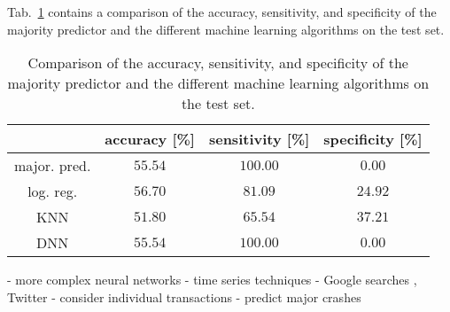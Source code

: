 Tab.~\ref{tab:comparison} contains a comparison of the accuracy, sensitivity, and specificity of the majority predictor and the different machine learning algorithms on the test set.

\begin{table}[h!]
\centering
\begin{tabular}{c||c|c|c}
   & accuracy [\%] & sensitivity [\%] & specificity [\%] \\
   \hline
   \hline
major. pred. & $55.54$ & $100.00$ & $0.00$\\
\hline
log. reg. & $56.70$ & $81.09$ & $24.92$ \\ 
\hline
KNN & $51.80$ & $65.54$ & $37.21$ \\
\hline
DNN & $55.54$ & $100.00$ & $0.00$
\end{tabular}
 \caption{Comparison of the accuracy, sensitivity, and specificity of the majority predictor and the different machine learning algorithms on the test set.}
 \label{tab:comparison}
\end{table}


- more complex neural networks
- time series techniques
- Google searches \cite{SocialMedia2015}, Twitter \cite{Twitter2019}
- consider individual transactions \cite{Classification2015}
- predict major crashes \cite{Musk2021} \cite{China2021} \cite{Binance2021}